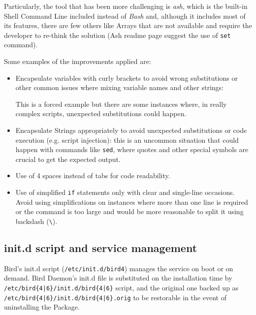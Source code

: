 Particularly, the tool that has been more challenging is \textit{ash}, which is the built-in Shell Command Line included instead of \textit{Bash} and, although it includes most of its features, there are few others like Arrays that are not available and require the developer to re-think the solution (Ash readme page suggest the use of \texttt{set} command).

Some examples of the improvements applied are:
\begin{itemize}
    \item Encapsulate variables with curly brackets to avoid wrong substitutions or other common issues where mixing variable names and other strings:
     
    This is a forced example but there are some instances where, in really complex scripts, unexpected substitutions could happen.
    \item Encapsulate Strings appropriately to avoid unexpected substitutions or code execution (e.g. script injection): this is an uncommon situation that could happen with commands like \texttt{sed}, where quotes and other special symbols are crucial to get the expected output.
    \item Use of 4 spaces instead of tabs for code readability.
    \item Use of simplified \texttt{if} statements only with clear and single-line occasions. Avoid using simplifications on instances where more than one line is required or the command is too large and would be more reasonable to split it using backslash (\texttt{\textbackslash}).
    
\end{itemize}

\subsection{init.d script and service management}
\label{sec:initd}
Bird's init.d script (\texttt{/etc/init.d/bird4}) manages the service on boot or on demand. Bird Daemon's init.d file is substituted on the installation time by \texttt{/etc/bird\{4|6\}/init.d/bird\{4|6\}} script, and the original one backed up as \texttt{/etc/bird\{4|6\}/init.d/bird\{4|6\}.orig} to be restorable in the event of uninstalling the Package.

